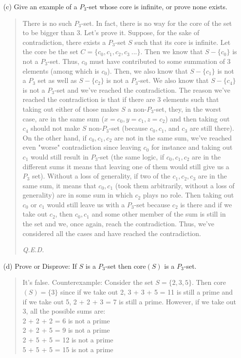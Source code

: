 \documentclass[12pt, a4paper]{article}                      %
\begin{document}
\begin{itemize}
\begin{itemize}
\item[(c)]
Give an example of a $P_3$-set whose core is infinite, or prove none exists.
\begin{quote}
There is no such $P_3$-set. In fact, there is no way for the core of the set to be bigger than 3.
Let's prove it. Suppose, for the sake of contradiction, there exists a $P_3$-set $S$ such that its core is infinite. Let the core be the set $C = \{c_0, c_1, c_2, c_3 \ ...\}$.
Then we know that $S - \{c_0\}$ is not a $P_3$-set. Thus, $c_0$ must have contributed
to some summation of 3 elements (among which is $c_0$). Then, we also know that $S - \{c_1\}$
is not a $P_3$ set as well as $S - \{c_2\}$ is not a $P_3$-set. We also know that $S - \{c_4\}$
is not a $P_3$-set and we've reached the contradiction. The reason we've reached the contradiction
is that if there are 3 elements such that taking out either of those makes $S$ a non-$P_3$-set,
they, in the worst case, are in the same sum ($x = c_0, y = c_1, z = c_2$) and then taking out $c_4$ should not
make $S$ non-$P_3$-set (because $c_0, c_1$, and $c_3$ are still there). On the other hand, if $c_0, c_1, c_2$ are not in the same sum, we've reached
even "worse" contradiction since leaving $c_0$ for instance and taking out $c_1$ would still
result in $P_3$-set (the same logic, if $c_0, c_1, c_2$ are in the different sums it means that leaving
one of them would still give us a $P_3$ set). Without a loss of generality, if two of the $c_1, c_2, c_3$
are in the same sum, it means that $c_0, c_1$ (took them arbitrarily, without a loss of generality) are in some
sum in which $c_2$ plays no role. Then taking out $c_0$ or $c_1$ would still leave us with a $P_3$-set because
$c_2$ is there and if we take out $c_2$, then $c_0, c_1$ and some other member of the sum is still in the set
and we, once again, reach the contradiction. Thus, we've considered all the cases and have reached the contradiction. 
\begin{flushright}
\textit{Q.E.D.}
\end{flushright}
\end{quote}

\item[]

\item[(d)]
Prove or Disprove: If $S$ is a $P_3$-set then core$(S)$ is a $P_3$-set. 
\begin{quote}
It's false. Counterexample: Consider the set $S = \{2, 3, 5\}$. Then core$(S) = \{3\}$ since if we take out 2, 3 + 3 + 5 = 11 is still a prime and if we take out 5, 2 + 2 + 3 = 7 is still a prime. However, if we take out 3, all the possible sums are:\\
2 + 2 + 2 = 6 is not a prime\\
2 + 2 + 5 = 9 is not a prime\\
2 + 5 + 5 = 12 is not a prime\\
5 + 5 + 5 = 15 is not a prime\\


\end{quote}
\end{itemize}
\end{itemize}
\end{document}
